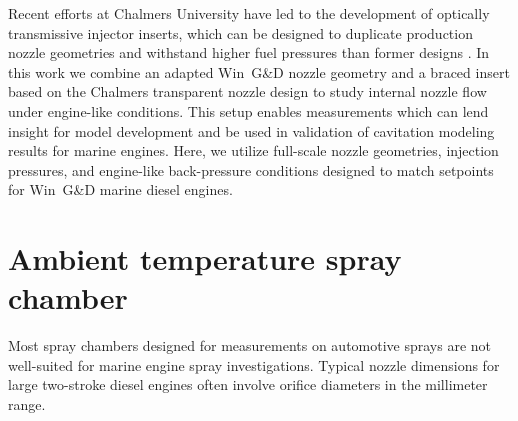\documentclass[letterpaper,twocolumn,10pt]{ilass}
\begin{document}
Recent efforts at Chalmers University have led to the development of optically
transmissive injector inserts, which can be designed to duplicate production nozzle geometries
and withstand higher fuel pressures than former designs \cite{Falgout2015}.
In this work we combine an adapted Win~G\&D nozzle geometry and a braced insert based on
the Chalmers transparent nozzle design to study internal nozzle flow under engine-like
conditions. This setup enables measurements which can lend insight for model development
and be used in validation of cavitation modeling results for marine engines.
%
Here, we utilize full-scale nozzle geometries, injection pressures, and engine-like
back-pressure conditions designed to match setpoints for Win~G\&D marine diesel engines. 

\section*{Ambient temperature spray chamber}
Most spray chambers designed for measurements on automotive sprays are not well-suited for
marine engine spray investigations.
Typical nozzle dimensions for large two-stroke diesel engines often involve orifice diameters in the millimeter range.
%
\end{document}
